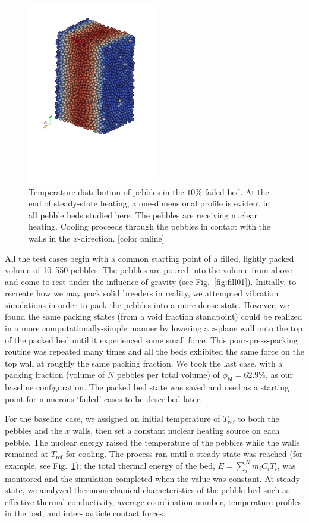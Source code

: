 \begin{figure}[htbp]
	\centering
	\includegraphics[trim=1cm 8cm 3cm 4cm, width=0.5\textwidth]{chapters/figures/pebbleBedTemperature}
	\caption{Temperature distribution of pebbles in the $10\%$ failed bed. At the end of steady-state heating, a one-dimensional profile is evident in all pebble beds studied here. The pebbles are receiving nuclear heating. Cooling proceeds through the pebbles in contact with the walls in the $x$-direction. [color online]}
\label{fig:pebbleBedTemperature}
\end{figure}

All the test cases begin with a common starting point of a filled, lightly packed volume of 10~550 pebbles. The pebbles are poured into the volume from above and come to rest under the influence of gravity (see Fig.~\ref{fig:fill01}). Initially, to recreate how we may pack solid breeders in reality, we attempted vibration simulations in order to pack the pebbles into a more dense state. However, we found the same packing states (from a void fraction standpoint) could be realized in a more computationally-simple manner by lowering a $z$-plane wall onto the top of the packed bed until it experienced some small force. This pour-press-packing routine was repeated many times and all the beds exhibited the same force on the top wall at roughly the same packing fraction. We took the last case, with a packing fraction (volume of $N$ pebbles per total volume) of $\phi_\text{bl}= 62.9\%$, as our baseline configuration. The packed bed state was saved and used as a starting point for numerous `failed' cases to be described later.

For the baseline case, we assigned an initial temperature of $T_\text{ref}$ to both the pebbles and the $x$ walls, then set a constant nuclear heating source on each pebble. The nuclear energy raised the temperature of the pebbles while the walls remained at $T_\text{ref}$ for cooling. The process ran until a steady state was reached (for example, see Fig.~\ref{fig:pebbleBedTemperature}); the total thermal energy of the bed, $E =\sum_i^N m_iC_i T_i$, was monitored and the simulation completed when the value was constant. At steady state, we analyzed thermomechanical characteristics of the pebble bed such as effective thermal conductivity, average coordination number, temperature profiles in the bed, and inter-particle contact forces.

